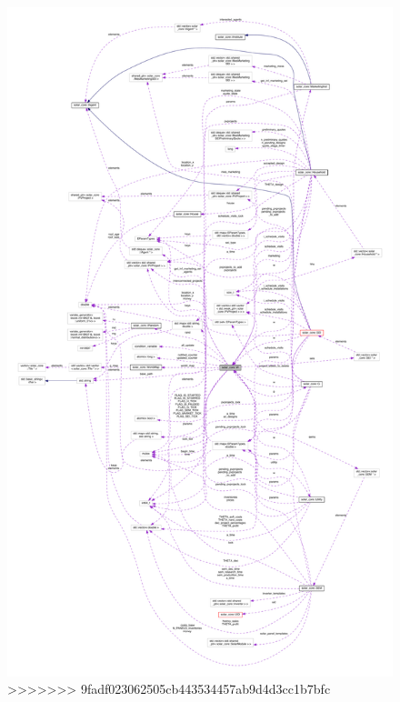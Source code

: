 \begin{figure}[H]
\begin{center}
\includegraphics[width=350pt]{classsolar__core_1_1_w__coll__graph}
>>>>>>> 9fadf023062505cb443534457ab9d4d3cc1b7bfc
\end{center}
\end{figure}
